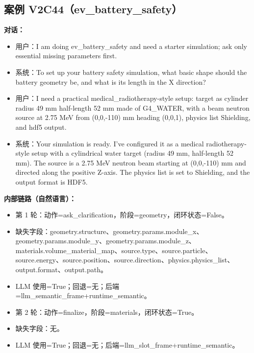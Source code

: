 \documentclass[11pt]{ctexart}
\begin{document}
\subsection{案例 V2C44（ev\_battery\_safety）}
\textbf{对话：}
\begin{itemize}
\item 用户：I am doing ev\_battery\_safety and need a starter simulation; ask only essential missing parameters first.
\item 系统：To set up your battery safety simulation, what basic shape should the battery geometry be, and what is its length in the X direction?
\item 用户：I need a practical medical\_radiotherapy-style setup: target as cylinder radius 49 mm half-length 52 mm made of G4\_WATER, with a beam neutron source at 2.75 MeV from (0,0,-110) mm heading (0,0,1), physics list Shielding, and hdf5 output.
\item 系统：Your simulation is ready. I've configured it as a medical radiotherapy-style setup with a cylindrical water target (radius 49 mm, half-length 52 mm). The source is a 2.75 MeV neutron beam starting at (0,0,-110) mm and directed along the positive Z-axis. The physics list is set to Shielding, and the output format is HDF5.
\end{itemize}
\textbf{内部链路（自然语言）：}
\begin{itemize}
\item 第 1 轮：动作=ask\_clarification，阶段=geometry，闭环状态=False。
\item 缺失字段：geometry.structure、geometry.params.module\_x、geometry.params.module\_y、geometry.params.module\_z、materials.volume\_material\_map、source.type、source.particle、source.energy、source.position、source.direction、physics.physics\_list、output.format、output.path。
\item LLM 使用=True；回退=无；后端=llm\_semantic\_frame+runtime\_semantic。
\item 第 2 轮：动作=finalize，阶段=materials，闭环状态=True。
\item 缺失字段：无。
\item LLM 使用=True；回退=无；后端=llm\_slot\_frame+runtime\_semantic。
\end{itemize}
\end{document}
